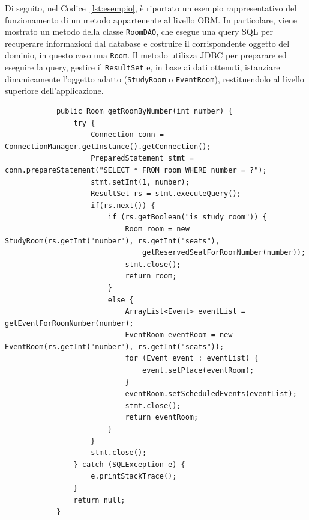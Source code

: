 Di seguito, nel Codice~\ref{lst:esempio}, è riportato un esempio rappresentativo del funzionamento di un metodo appartenente al livello ORM. In particolare, viene mostrato un metodo della classe \texttt{RoomDAO}, che esegue una query SQL per recuperare informazioni dal database e costruire il corrispondente oggetto del dominio, in questo caso una \texttt{Room}.
    Il metodo utilizza JDBC per preparare ed eseguire la query, gestire il \texttt{ResultSet} e, in base ai dati ottenuti, istanziare dinamicamente l'oggetto adatto (\texttt{StudyRoom} o \texttt{EventRoom}), restituendolo al livello superiore dell'applicazione.
    \begin{listing}[H]
        \begin{verbatim}
            public Room getRoomByNumber(int number) {
                try {
                    Connection conn = ConnectionManager.getInstance().getConnection();
                    PreparedStatement stmt = conn.prepareStatement("SELECT * FROM room WHERE number = ?");
                    stmt.setInt(1, number);
                    ResultSet rs = stmt.executeQuery();
                    if(rs.next()) {
                        if (rs.getBoolean("is_study_room")) {
                            Room room = new StudyRoom(rs.getInt("number"), rs.getInt("seats"), 
                                getReservedSeatForRoomNumber(number));
                            stmt.close();
                            return room;
                        }
                        else {
                            ArrayList<Event> eventList = getEventForRoomNumber(number);
                            EventRoom eventRoom = new EventRoom(rs.getInt("number"), rs.getInt("seats"));
                            for (Event event : eventList) {
                                event.setPlace(eventRoom);
                            }
                            eventRoom.setScheduledEvents(eventList);
                            stmt.close();
                            return eventRoom;
                        }
                    }
                    stmt.close();
                } catch (SQLException e) {
                    e.printStackTrace();
                }
                return null;
            }
        \end{verbatim}
        \caption{Esempio di metodo DAO per il recupero di dati dal DB}
        \label{lst:esempio}
    \end{listing}

